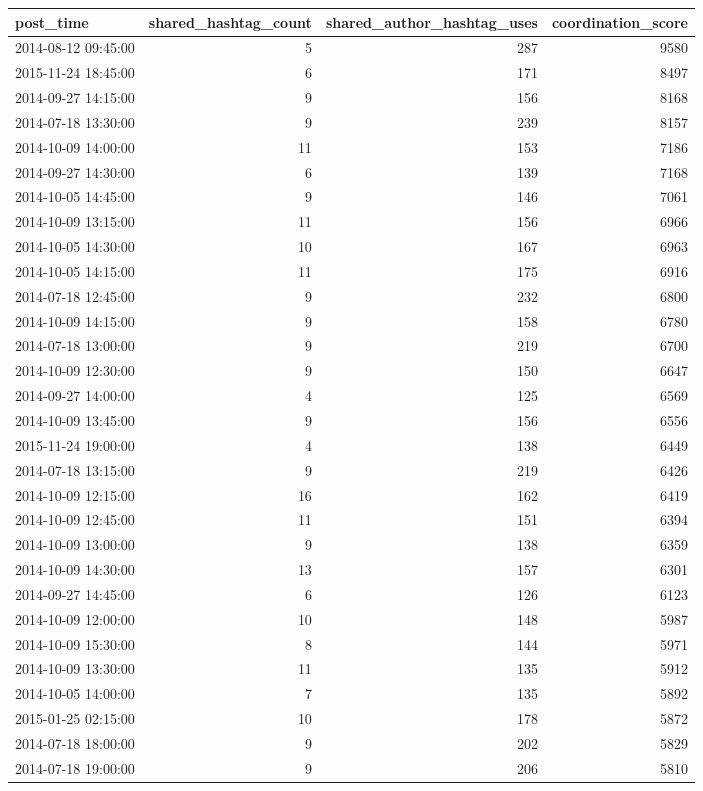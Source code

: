 \begin{tabular}{lrrr}
\toprule
post\_time & shared\_hashtag\_count & shared\_author\_hashtag\_uses & coordination\_score \\
\midrule
2014-08-12 09:45:00 & 5 & 287 & 9580 \\
2015-11-24 18:45:00 & 6 & 171 & 8497 \\
2014-09-27 14:15:00 & 9 & 156 & 8168 \\
2014-07-18 13:30:00 & 9 & 239 & 8157 \\
2014-10-09 14:00:00 & 11 & 153 & 7186 \\
2014-09-27 14:30:00 & 6 & 139 & 7168 \\
2014-10-05 14:45:00 & 9 & 146 & 7061 \\
2014-10-09 13:15:00 & 11 & 156 & 6966 \\
2014-10-05 14:30:00 & 10 & 167 & 6963 \\
2014-10-05 14:15:00 & 11 & 175 & 6916 \\
2014-07-18 12:45:00 & 9 & 232 & 6800 \\
2014-10-09 14:15:00 & 9 & 158 & 6780 \\
2014-07-18 13:00:00 & 9 & 219 & 6700 \\
2014-10-09 12:30:00 & 9 & 150 & 6647 \\
2014-09-27 14:00:00 & 4 & 125 & 6569 \\
2014-10-09 13:45:00 & 9 & 156 & 6556 \\
2015-11-24 19:00:00 & 4 & 138 & 6449 \\
2014-07-18 13:15:00 & 9 & 219 & 6426 \\
2014-10-09 12:15:00 & 16 & 162 & 6419 \\
2014-10-09 12:45:00 & 11 & 151 & 6394 \\
2014-10-09 13:00:00 & 9 & 138 & 6359 \\
2014-10-09 14:30:00 & 13 & 157 & 6301 \\
2014-09-27 14:45:00 & 6 & 126 & 6123 \\
2014-10-09 12:00:00 & 10 & 148 & 5987 \\
2014-10-09 15:30:00 & 8 & 144 & 5971 \\
2014-10-09 13:30:00 & 11 & 135 & 5912 \\
2014-10-05 14:00:00 & 7 & 135 & 5892 \\
2015-01-25 02:15:00 & 10 & 178 & 5872 \\
2014-07-18 18:00:00 & 9 & 202 & 5829 \\
2014-07-18 19:00:00 & 9 & 206 & 5810 \\

\end{tabular}
